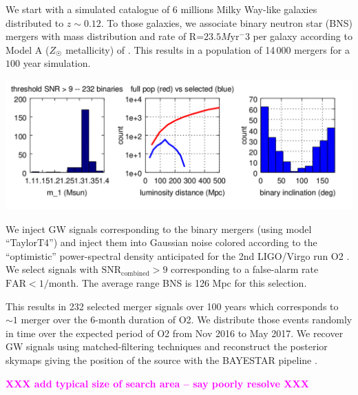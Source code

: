 \documentclass[a0,portrait]{a0poster}
\newcommand{\ECM}[1] {\textbf{\textcolor{magenta}{#1}}}
\begin{document}
\begin{multicols}{2}
We start with a simulated catalogue of 6 millions Milky Way-like galaxies
distributed to $z\sim 0.12$. To those galaxies, we associate binary neutron star
(BNS) mergers with mass distribution and rate of R=$23.5 M\mathrm{yr}^-3$ per galaxy
according to Model A ($Z_{\astrosun}$ metallicity) of
\cite{dominik12:_doubl_compac_objec}. This results in a population of 14\,000
mergers for a $100$ year simulation.

\begin{center}\vspace{.5cm}
    \includegraphics[width=30cm]{figures/summary_plot.png}
\end{center}

We inject GW signals corresponding to the binary mergers (using model
``TaylorT4'') and inject them into Gaussian noise colored according to the
``optimistic'' power-spectral density anticipated for the 2nd LIGO/Virgo run O2
\cite{lrr-2016-1}. We select signals with $\mathrm{SNR}_{\mathrm{combined}} > 9$
corresponding to a false-alarm rate $\mathrm{FAR} < 1/\mathrm{month}$. The average range
BNS is 126 Mpc for this selection.

This results in 232 selected merger signals over 100 years which corresponds to
$\sim 1$ merger over the 6-month duration of O2. We distribute those events randomly in
time over the expected period of O2 from Nov 2016 to May 2017. We
recover GW signals using matched-filtering techniques and reconstruct the
posterior skymaps giving the position of the source with the BAYESTAR pipeline
\cite{PhysRevD.93.024013}.

\ECM{XXX add typical size of search area -- say poorly resolve XXX}




\end{multicols}
\end{document}
